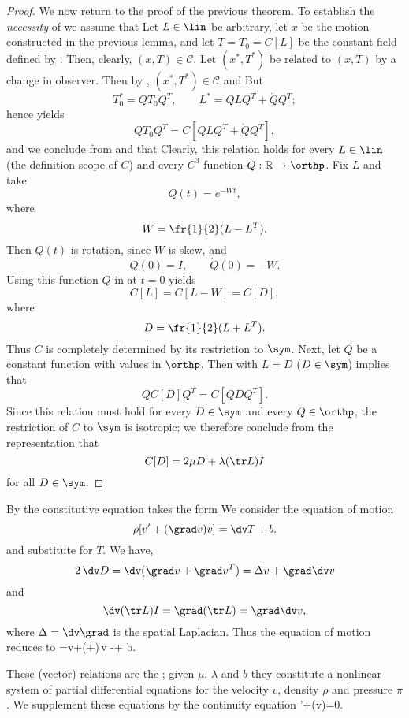 \begin{proof}
We now return to the proof of the previous theorem. To establish the 
{\it necessity} of  we assume that
Let $L \in \lin$ be arbitrary, let $x$ be the motion constructed in the previous lemma, and let
$T=T_0=C[L]$ be the constant field defined by . Then, clearly, 
$(x,T)\in \mathcal C$. Let $(x^*,T^*)$ be related to $(x,T)$ by a change in observer. 
Then by , $(x^*,T^*)\in \mathcal C$ and
But
$$T^*_0=QT_0Q^T,\qquad L^*=QLQ^T+\dot QQ^T;$$
hence  yields
$$QT_0Q^T=C[QLQ^T+\dot QQ^T],$$
and we conclude from  and  that
Clearly, this relation holds for every $L\in\lin$ (the definition scope of $C$) and every $C^3$ function
$Q:\mathbb R \rightarrow \orthp$. Fix $L$ and take $$Q(t)=e^{-Wt},$$ where $$W=\fr{1}{2}(L-L^T).$$
Then $Q(t)$ is rotation, since $W$ is skew, and $$Q(0)=I,\qquad \dot Q(0)=-W.$$
Using this function $Q$ in  at $t=0$ yields
$$C[L]=C[L-W]=C[D],$$ where $$D=\fr{1}{2}(L+L^T).$$
Thus $C$ is completely determined by its restriction to $\sym$.
Next, let $Q$ be a constant function with values in $\orthp$. Then  with
$L=D$ ($D\in\sym$) implies that $$QC[D]Q^T=C[QDQ^T].$$
Since this relation must hold for every $D\in\sym$ and every $Q\in\orthp$, the restriction
of $C$ to $\sym$ is isotropic; we therefore conclude from the representation  that
$$C[D]=2\mu D + \lambda (\tr L)I$$ for all $D\in\sym$.

\end{proof}

By  the constitutive equation  takes the form
We consider the equation of motion
$$\rho[v'+(\grad v)v]=\dv T+b.$$
and substitute  for $T$.
We have,
$$2\,\dv D=\dv(\grad v+\grad v^T)=\Delta v+\grad \dv v$$
and
$$\dv(\tr L)I=\grad(\tr L)=\grad \dv v,$$
where $\Delta=\dv \grad$ is the spatial Laplacian. Thus the equation of motion reduces to
{
\rho[v'+(\grad v)v]=\mu\Delta v+(\lambda+\mu)\,\grad \dv v -\grad \pi + b.
}

These (vector) relations are the ; given $\mu$, $\lambda$ and $b$ 
they constitute a nonlinear system of partial differential equations for the velocity 
$v$, density $\rho$ and pressure $\pi$.
We supplement these equations by the continuity equation
{
\rho'+\dv(\rho v)=0.
}

